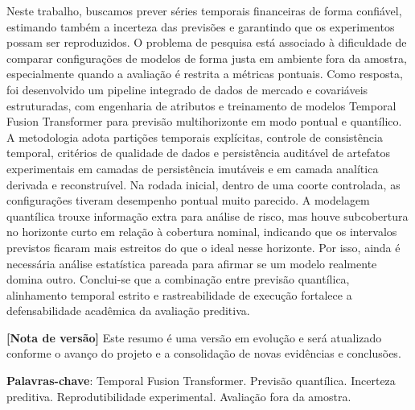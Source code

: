 \begin{resumo}

Neste trabalho, buscamos prever séries temporais financeiras de forma confiável, estimando também a incerteza das previsões e garantindo que os experimentos possam ser reproduzidos. O problema de pesquisa está associado à dificuldade de comparar configurações de modelos de forma justa em ambiente fora da amostra, especialmente quando a avaliação é restrita a métricas pontuais. Como resposta, foi desenvolvido um pipeline integrado de dados de mercado e covariáveis estruturadas, com engenharia de atributos e treinamento de modelos Temporal Fusion Transformer para previsão multihorizonte em modo pontual e quantílico. A metodologia adota partições temporais explícitas, controle de consistência temporal, critérios de qualidade de dados e persistência auditável de artefatos experimentais em camadas de persistência imutáveis e em camada analítica derivada e reconstruível. Na rodada inicial, dentro de uma coorte controlada, as configurações tiveram desempenho pontual muito parecido. A modelagem quantílica trouxe informação extra para análise de risco, mas houve subcobertura no horizonte curto em relação à cobertura nominal, indicando que os intervalos previstos ficaram mais estreitos do que o ideal nesse horizonte. Por isso, ainda é necessária análise estatística pareada para afirmar se um modelo realmente domina outro. Conclui-se que a combinação entre previsão quantílica, alinhamento temporal estrito e rastreabilidade de execução fortalece a defensabilidade acadêmica da avaliação preditiva.

\textbf{[Nota de versão]} Este resumo é uma versão em evolução e será atualizado conforme o avanço do projeto e a consolidação de novas evidências e conclusões.

\textbf{Palavras-chave}: Temporal Fusion Transformer. Previsão quantílica. Incerteza preditiva. Reprodutibilidade experimental. Avaliação fora da amostra.

\end{resumo}	

